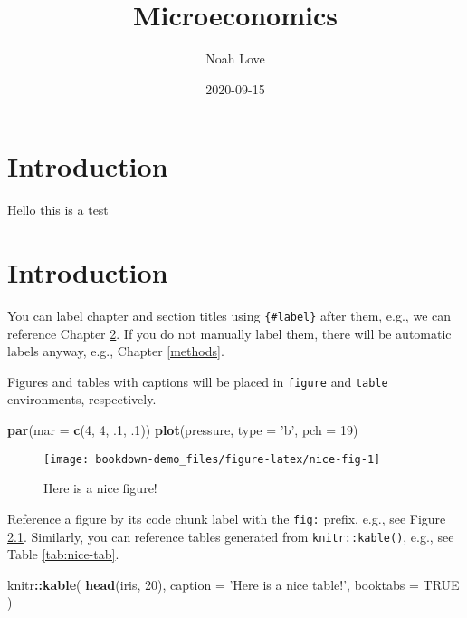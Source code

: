 \documentclass[
]{book}
\title{Microeconomics}
\author{Noah Love}
\date{2020-09-15}
\newenvironment{Shaded}{\begin{snugshade}}{\end{snugshade}}
\newcommand{\DataTypeTok}[1]{\textcolor[rgb]{0.13,0.29,0.53}{#1}}
\newcommand{\DecValTok}[1]{\textcolor[rgb]{0.00,0.00,0.81}{#1}}
\newcommand{\FloatTok}[1]{\textcolor[rgb]{0.00,0.00,0.81}{#1}}
\newcommand{\KeywordTok}[1]{\textcolor[rgb]{0.13,0.29,0.53}{\textbf{#1}}}
\newcommand{\NormalTok}[1]{#1}
\newcommand{\OperatorTok}[1]{\textcolor[rgb]{0.81,0.36,0.00}{\textbf{#1}}}
\newcommand{\OtherTok}[1]{\textcolor[rgb]{0.56,0.35,0.01}{#1}}
\newcommand{\StringTok}[1]{\textcolor[rgb]{0.31,0.60,0.02}{#1}}
\begin{document}
\maketitle

{
\setcounter{tocdepth}{1}
\tableofcontents
}
\hypertarget{introduction}{%
\chapter{Introduction}\label{introduction}}

Hello this is a test

\hypertarget{intro}{%
\chapter{Introduction}\label{intro}}

You can label chapter and section titles using \texttt{\{\#label\}} after them, e.g., we can reference Chapter \ref{intro}. If you do not manually label them, there will be automatic labels anyway, e.g., Chapter \ref{methods}.

Figures and tables with captions will be placed in \texttt{figure} and \texttt{table} environments, respectively.

\begin{Shaded}
\begin{Highlighting}[]
\KeywordTok{par}\NormalTok{(}\DataTypeTok{mar =} \KeywordTok{c}\NormalTok{(}\DecValTok{4}\NormalTok{, }\DecValTok{4}\NormalTok{, }\FloatTok{.1}\NormalTok{, }\FloatTok{.1}\NormalTok{))}
\KeywordTok{plot}\NormalTok{(pressure, }\DataTypeTok{type =} \StringTok{'b'}\NormalTok{, }\DataTypeTok{pch =} \DecValTok{19}\NormalTok{)}
\end{Highlighting}
\end{Shaded}

\begin{figure}

{\centering \texttt{[image: bookdown-demo\_files/figure-latex/nice-fig-1]} 

}

\caption{Here is a nice figure!}\label{fig:nice-fig}
\end{figure}

Reference a figure by its code chunk label with the \texttt{fig:} prefix, e.g., see Figure \ref{fig:nice-fig}. Similarly, you can reference tables generated from \texttt{knitr::kable()}, e.g., see Table \ref{tab:nice-tab}.

\begin{Shaded}
\begin{Highlighting}[]
\NormalTok{knitr}\OperatorTok{::}\KeywordTok{kable}\NormalTok{(}
  \KeywordTok{head}\NormalTok{(iris, }\DecValTok{20}\NormalTok{), }\DataTypeTok{caption =} \StringTok{'Here is a nice table!'}\NormalTok{,}
  \DataTypeTok{booktabs =} \OtherTok{TRUE}
\NormalTok{)}
\end{Highlighting}
\end{Shaded}
\end{document}
